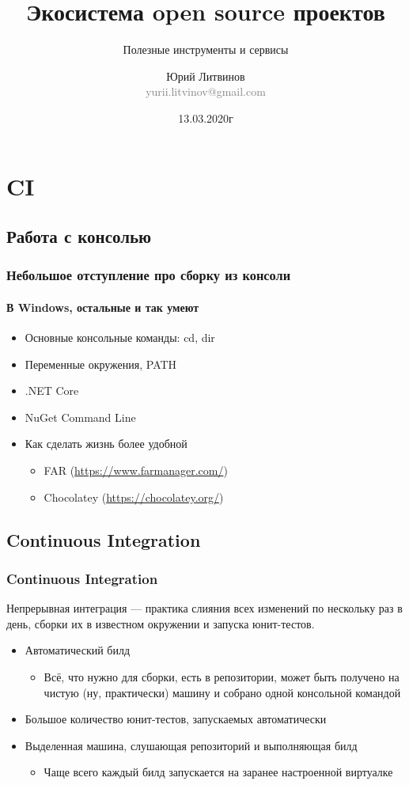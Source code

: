 \documentclass[xetex,mathserif,serif]{beamer}
\title{Экосистема open source проектов}
\subtitle{Полезные инструменты и сервисы}
\author[Юрий Литвинов]{Юрий Литвинов\\\small{\textcolor{gray}{yurii.litvinov@gmail.com}}}
\date{13.03.2020г}
\begin{document}
	\frame{\titlepage}

	\section{CI}

	\subsection{Работа с консолью}

	\begin{frame}
		\frametitle{Небольшое отступление про сборку из консоли}
		\framesubtitle{В Windows, остальные и так умеют}
		\begin{itemize}
			\item Основные консольные команды: cd, dir
			\item Переменные окружения, PATH
			\item .NET Core
			\item NuGet Command Line
			\item Как сделать жизнь более удобной
			\begin{itemize}
				\item FAR (\url{https://www.farmanager.com/})
				\item Chocolatey (\url{https://chocolatey.org/})
			\end{itemize}
		\end{itemize}
	\end{frame}

	\subsection{Continuous Integration}

	\begin{frame}
		\frametitle{Continuous Integration}
		Непрерывная интеграция --- практика слияния всех изменений по нескольку раз в день, сборки их в известном окружении и запуска юнит-тестов.
		\begin{itemize}
			\item Автоматический билд
			\begin{itemize}
				\item Всё, что нужно для сборки, есть в репозитории, может быть получено на чистую (ну, практически) машину и собрано одной консольной командой
			\end{itemize}
			\item Большое количество юнит-тестов, запускаемых автоматически
			\item Выделенная машина, слушающая репозиторий и выполняющая билд
			\begin{itemize}
				\item Чаще всего каждый билд запускается на заранее настроенной виртуалке
			\end{itemize}
		\end{itemize}
	\end{frame}
\end{document}
